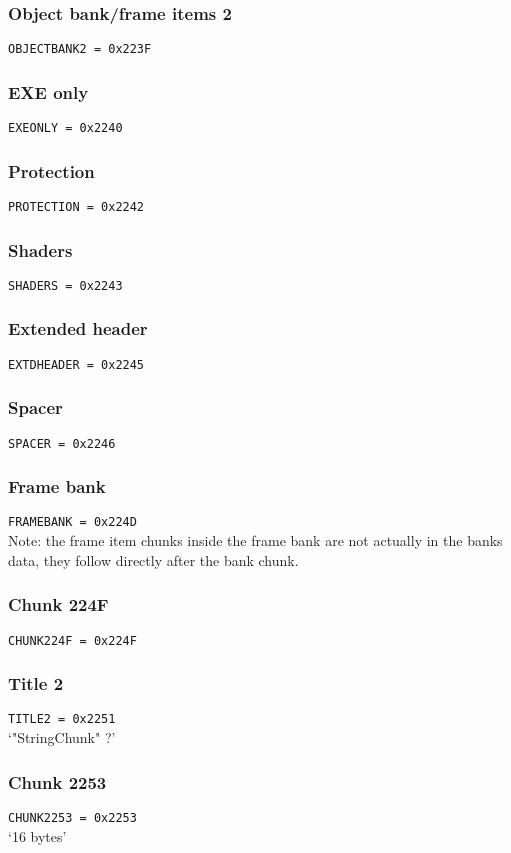 \documentclass{article}
\begin{document}
\subsubsection{Object bank/frame items 2}
\verb|OBJECTBANK2 = 0x223F|

\subsubsection{EXE only}
\verb|EXEONLY = 0x2240|

\subsubsection{Protection}
\verb|PROTECTION = 0x2242|

\subsubsection{Shaders}
\verb|SHADERS = 0x2243|

\subsubsection{Extended header}
\verb|EXTDHEADER = 0x2245|

\subsubsection{Spacer}
\verb|SPACER = 0x2246|

\subsubsection{Frame bank}
\verb|FRAMEBANK = 0x224D|
\\
Note: the frame item chunks inside the frame bank are not actually in the banks
data, they follow directly after the bank chunk.

\subsubsection{Chunk 224F}
\verb|CHUNK224F = 0x224F|

\subsubsection{Title 2}
\verb|TITLE2 = 0x2251|
\\
`"StringChunk" ?'

\subsubsection{Chunk 2253}
\verb|CHUNK2253 = 0x2253|
\\
`16 bytes'
\end{document}
